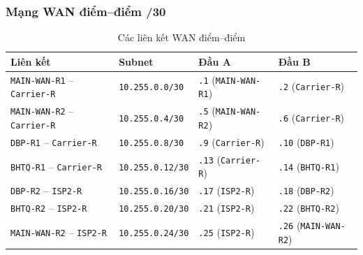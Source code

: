 \subsubsection{Mạng WAN điểm--điểm /30}
\begin{small}
\begin{longtable}{|l|l|l|l|}
\caption{Các liên kết WAN điểm--điểm} \label{tab:wan_p2p} \\
\hline
\textbf{Liên kết} & \textbf{Subnet} & \textbf{Đầu A} & \textbf{Đầu B} \\ \hline
\endhead
\texttt{MAIN-WAN-R1} -- \texttt{Carrier-R} & \texttt{10.255.0.0/30} & \texttt{.1} (\texttt{MAIN-WAN-R1}) & \texttt{.2} (\texttt{Carrier-R}) \\ \hline
\texttt{MAIN-WAN-R2} -- \texttt{Carrier-R} & \texttt{10.255.0.4/30} & \texttt{.5} (\texttt{MAIN-WAN-R2}) & \texttt{.6} (\texttt{Carrier-R}) \\ \hline
\texttt{DBP-R1} -- \texttt{Carrier-R} & \texttt{10.255.0.8/30} & \texttt{.9} (\texttt{Carrier-R}) & \texttt{.10} (\texttt{DBP-R1}) \\ \hline
\texttt{BHTQ-R1} -- \texttt{Carrier-R} & \texttt{10.255.0.12/30} & \texttt{.13} (\texttt{Carrier-R}) & \texttt{.14} (\texttt{BHTQ-R1}) \\ \hline
\texttt{DBP-R2} -- \texttt{ISP2-R} & \texttt{10.255.0.16/30} & \texttt{.17} (\texttt{ISP2-R}) & \texttt{.18} (\texttt{DBP-R2}) \\ \hline
\texttt{BHTQ-R2} -- \texttt{ISP2-R} & \texttt{10.255.0.20/30} & \texttt{.21} (\texttt{ISP2-R}) & \texttt{.22} (\texttt{BHTQ-R2}) \\ \hline
\texttt{MAIN-WAN-R2} -- \texttt{ISP2-R} & \texttt{10.255.0.24/30} & \texttt{.25} (\texttt{ISP2-R}) & \texttt{.26} (\texttt{MAIN-WAN-R2}) \\ \hline
\end{longtable}
\end{small}

